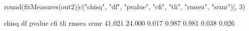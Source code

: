 \begin{Schunk}
\begin{Sinput}
 round(fitMeasures(out2)[c("chisq", "df", "pvalue", "cfi", 
                           "tli", "rmsea", "srmr")], 3)
\end{Sinput}
\begin{Soutput}
 chisq     df pvalue    cfi    tli  rmsea   srmr 
41.021 24.000  0.017  0.987  0.981  0.038  0.026 
\end{Soutput}
\end{Schunk}
